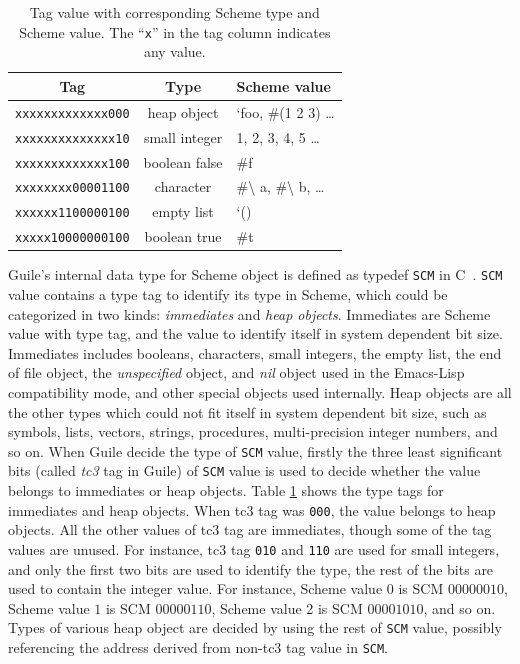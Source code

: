 \documentclass[preprint, 10pt]{sigplanconf}
\begin{document}
\begin{table}
  \begin{center}
  \begin{tabular}{ccl}
    Tag&Type&Scheme value\\
    \toprule
    \texttt{xxxxxxxxxxxxx000} & heap object & `foo, \#(1 2 3) \ldots \\
    \texttt{xxxxxxxxxxxxxx10} & small integer & 1, 2, 3, 4, 5 \ldots \\
    \texttt{xxxxxxxxxxxxx100} & boolean false & \#f \\
    \texttt{xxxxxxxx00001100} & character & \#\textbackslash{} a,
    \#\textbackslash{} b, \ldots \\
    \texttt{xxxxxx1100000100} & empty list & `() \\
    \texttt{xxxxx10000000100} & boolean true & \#t \\
  \end{tabular}
  \end{center}
  \caption{Tag value with corresponding Scheme type and Scheme value. The
    ``\texttt{x}'' in the tag column indicates any value.}
\label{tab:tags}
\end{table}

Guile's internal data type for Scheme object is defined as typedef
\texttt{SCM} in C~\cite{Galassi02guilereference}. \texttt{SCM} value contains
a type tag to identify its type in Scheme, which could be categorized in two
kinds: \textit{immediates} and \textit{heap objects}. Immediates are Scheme
value with type tag, and the value to identify itself in system dependent bit
size. Immediates includes booleans, characters, small integers, the empty
list, the end of file object, the \textit{unspecified} object, and
\textit{nil} object used in the Emacs-Lisp compatibility mode, and other
special objects used internally. Heap objects are all the other types which
could not fit itself in system dependent bit size, such as symbols, lists,
vectors, strings, procedures, multi-precision integer numbers, and so on.
When Guile decide the type of \texttt{SCM} value, firstly the three least
significant bits (called \textit{tc3} tag in Guile) of \texttt{SCM} value is
used to decide whether the value belongs to immediates or heap objects. Table
\hyperref[tab:tags]{\ref{tab:tags}} shows the type tags for immediates and
heap objects. When tc3 tag was \texttt{000}, the value belongs to heap
objects. All the other values of tc3 tag are immediates, though some of the
tag values are unused. For instance, tc3 tag \texttt{010} and \texttt{110} are
used for small integers, and only the first two bits are used to identify the
type, the rest of the bits are used to contain the integer value. For
instance, Scheme value $0$ is SCM $00000010$, Scheme value $1$ is SCM
$00000110$, Scheme value 2 is SCM $00001010$, and so on. Types of various heap
object are decided by using the rest of \texttt{SCM} value, possibly
referencing the address derived from non-tc3 tag value in \texttt{SCM}.
\end{document}
